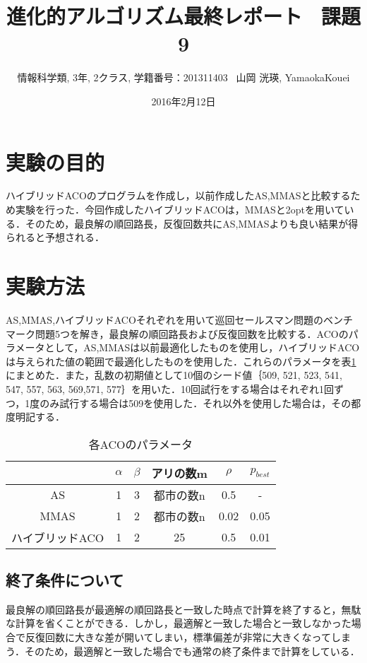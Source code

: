 \documentclass[a4j]{jsarticle}
\title{進化的アルゴリズム最終レポート \ 課題9}
\author{情報科学類, 3年, 2クラス, 学籍番号：201311403 \ 山岡 洸瑛, YamaokaKouei}
\date{2016年2月12日}
\begin{document}
\begin{titlepage}
\maketitle 
\thispagestyle{empty}
\end{titlepage}
\setcounter{tocdepth}{3}
\tableofcontents
\newpage
\section{実験の目的}
ハイブリッドACOのプログラムを作成し，以前作成したAS,MMASと比較するため実験を行った．今回作成したハイブリッドACOは，MMASと2optを用いている．そのため，最良解の順回路長，反復回数共にAS,MMASよりも良い結果が得られると予想される．
\section{実験方法}
AS,MMAS,ハイブリッドACOそれぞれを用いて巡回セールスマン問題のベンチマーク問題5つを解き，最良解の順回路長および反復回数を比較する．ACOのパラメータとして，AS,MMASは以前最適化したものを使用し，ハイブリッドACOは与えられた値の範囲で最適化したものを使用した．これらのパラメータを表\ref{para}にまとめた．また，乱数の初期値として10個のシード値｛509, 521, 523, 541, 547, 557, 563, 569,571, 577｝を用いた．10回試行をする場合はそれぞれ1回ずつ，1度のみ試行する場合は509を使用した．それ以外を使用した場合は，その都度明記する．

\begin{table}[H]
 \begin{center}
  \caption{各ACOのパラメータ}
  \label{para}
  \begin{tabular}[tb]{|c|c|c|c|c|c|} \hline
   & $\alpha$ & $\beta$ & アリの数m & $\rho$ & $p_{best}$ \\\hline
   AS & 1 & 3 & 都市の数n & 0.5 & - \\\hline
   MMAS & 1 & 2 & 都市の数n & 0.02 & 0.05 \\\hline
   ハイブリッドACO & 1 & 2 & 25 & 0.5 & 0.01 \\\hline
  \end{tabular}
 \end{center}
\end{table}

\subsection{終了条件について}
最良解の順回路長が最適解の順回路長と一致した時点で計算を終了すると，無駄な計算を省くことができる．しかし，最適解と一致した場合と一致しなかった場合で反復回数に大きな差が開いてしまい，標準偏差が非常に大きくなってしまう．そのため，最適解と一致した場合でも通常の終了条件まで計算をしている．
\end{document}
